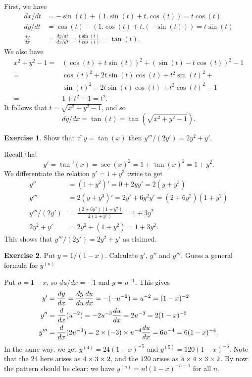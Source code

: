 \documentclass[a4paper]{amsart}
\theoremstyle{definition}
\newtheorem{exercise}{Exercise}[section]
\newenvironment{solution}{{\noindent \bf Solution:}}{}
\begin{document}
\begin{solution}
First, we have
 \begin{align*}
  dx/dt &= -\sin(t) + (1.\sin(t) + t.\cos(t)) = t\cos(t) \\
  dy/dt &= \cos(t) - (1.\cos(t) + t.(-\sin(t))) = t\sin(t) \\
  \frac{dy}{dx} &= \frac{dy/dt}{dx/dt} 
    = \frac{t\sin(t)}{t\cos(t)} = \tan(t).
 \end{align*}
 We also have
 \begin{align*}
  x^2+y^2-1 =&
   (\cos(t)+t\sin(t))^2 + (\sin(t)-t\cos(t))^2 -  1  \\
  =& \cos(t)^2 + 2t\sin(t)\cos(t) + t^2\sin(t)^2 + \\
   & \sin(t)^2 - 2t\sin(t)\cos(t) + t^2\cos(t)^2 - 1 \\
  =& 1+t^2-1 = t^2.
 \end{align*}
 It follows that $t=\sqrt{x^2+y^2-1}$, and so 
 \[ dy/dx = \tan(t) = \tan(\sqrt{x^2+y^2-1}). \]
\end{solution}
\begin{exercise}\label{ex-tandiffeq}
Show that if $y=\tan(x)$ then $y'''/(2y')=2y^2+y'$.
\end{exercise}
\begin{solution}
Recall that 
 \[ y'=\tan'(x)=\sec(x)^2=1+\tan(x)^2=1+y^2. \]
 We differentiate the relation $y'=1+y^2$ twice to get
 \begin{align*}
  y''  &= (1+y^2)' = 0+2yy' = 2(y+y^3) \\
  y''' &= 2(y+y^3)' = 2y'+6y^2y' = (2+6y^2)(1+y^2) \\
  y'''/(2y') &= \frac{(2+6y^2)(1+y^2)}{2(1+y^2)} 
              = 1+3y^2 \\
  2y^2+y' &= 2y^2 + (1 + y^2) = 1+3y^2.
 \end{align*}
 This shows that $y'''/(2y')=2y^2+y'$ as claimed.
\end{solution}
\begin{exercise}\label{ex-gpdiff}
Put $y=1/(1-x)$.  Calculate $y'$, $y''$ and $y'''$.  Guess a
 general formula for $y^{(n)}$
\end{exercise}
\begin{solution}
Put $u=1-x$, so $du/dx=-1$ and $y=u^{-1}$.  This gives
 \begin{align*}
  y'   &= \frac{dy}{dx} = \frac{dy}{du}\frac{du}{dx}
        = - (-u^{-2}) = u^{-2} = (1-x)^{-2} \\
  y''  &= \frac{d}{dx}(u^{-2}) = -2u^{-3}\frac{du}{dx} 
        = 2u^{-3} = 2(1-x)^{-3} \\
  y''' &= \frac{d}{dx}(2u^{-3}) = 2\times(-3)\times u^{-4}\frac{du}{dx} 
        = 6u^{-4} = 6(1-x)^{-4}.  
 \end{align*}
 In the same way, we get $y^{(4)}=24(1-x)^{-5}$ and
 $y^{(5)}=120(1-x)^{-6}$.  Note that the $24$ here arises as
 $4\times 3\times 2$, and the $120$ arises as
 $5\times 4\times 3\times 2$.  By now the pattern should be
 clear: we have $y^{(n)}=n!(1-x)^{-n-1}$ for all $n$.
\end{solution}
\end{document}
